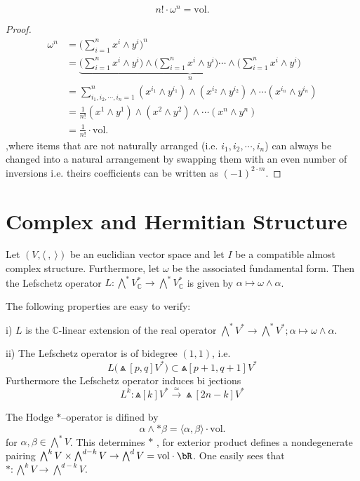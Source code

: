\[
  n!\cdot \omega^n=\mathrm{vol}.
\]
\newcommand{\br}[3][b]{\#1igl#2 #3 #1igr#2}
\begin{proof}
  \begin{align*}
 \omega^n&=\bigl(\sum_{i=1}^{n}x^i\wedge y^i\bigr)^n\\
 &=\underbrace{\bigl(\sum_{i=1}^{n}x^i\wedge y^i\bigr)\wedge \bigl(\sum_{i=1}^{n}x^i\wedge y^i\bigr)\cdots\wedge \bigl(\sum_{i=1}^{n}x^i\wedge y^i\bigr)}_{n}\\
 &=\sum_{i_1,i_2,\cdots,i_n=1}^n (x^{i_1}\wedge y^{i_1})\wedge (x^{i_2}\wedge y^{i_2})\wedge\cdots (x^{i_n}\wedge y^{i_n})\\
 &=\frac{1}{n!} (x^1\wedge y^1)\wedge (x^2\wedge y^2)\wedge \cdots (x^n\wedge y^n)\\
 &=\frac{1}{n!}\cdot \mathrm{vol}.
  \end{align*}
  ,where items that are not naturally arranged (i.e. $i_1,i_2,\cdots,i_n$) can always be changed into a natural arrangement by swapping them with an even number of inversions i.e. theirs coefficients can be written as $(-1)^{2\cdot m}$.
\end{proof}
\Line
\section{Complex and Hermitian Structure}
\begin{definition}
   Let $(V,\langle~,~\rangle) $ be an euclidian vector space and let $I$ be a compatible almost complex structure. Furthermore, let $\omega$ be the associated fundamental form. Then the \textsf{Lefschetz operator} $L: \bigwedge^* V_{\mathbb{C}}^* \rightarrow \bigwedge^* V_{\mathbb{C}}^*$ is given by $\alpha \mapsto \omega \wedge \alpha$.
\end{definition}
\begin{remark}
The following properties are easy to verify:

i) $L$ is the $\mathbb{C}$-linear extension of the real operator $\bigwedge^* V^* \rightarrow \bigwedge^* V^*;  \alpha \mapsto \omega \wedge \alpha$.

ii) The Lefschetz operator is of bidegree $(1,1)$, i.e.
$$
L\bigl(\Wedge[p, q] V^*\bigr) \subset \Wedge[p+1, q+1] V^*
$$
Furthermore the Lefschetz operator induces bi jections
$$
L^k: \Wedge[k] V^* \stackrel{\simeq}{\longrightarrow} \Wedge[2n-k] V^*
$$
\end{remark}

\begin{definition}
  The \textsf{Hodge $*$--operator} is difined by 
\[
  \alpha\wedge*\beta=\langle\alpha,\beta\rangle\cdot \mathrm{vol}.
\]
for $\alpha,\beta\in \bigwedge^* V$. This determines $*$ , for exterior product defines a nondegenerate pairing $\bigwedge^k V\times \bigwedge^{d-k} V\to \bigwedge^d V=\mathrm{vol}\cdot \bR$. One easily sees that $*\colon \bigwedge^k V\to \bigwedge^{d-k} V$.
\end{definition}

